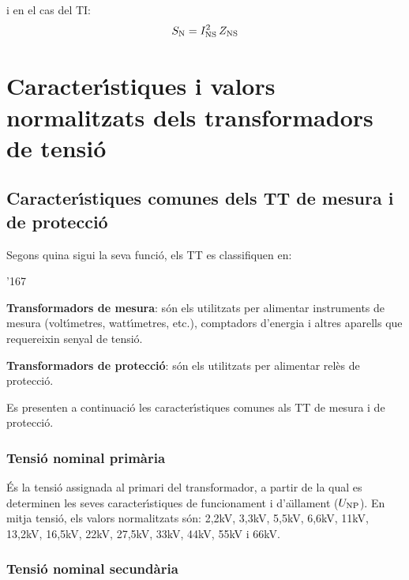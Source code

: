 i en el cas del TI:
\begin{equation}\label{eq:sn_ti}
    S_\mathrm{N} = I_\mathrm{NS}^2 \,Z_\mathrm{NS}
\end{equation}


\section{Caracter\'{\i}stiques i valors normalitzats dels transformadors de tensi\'{o}}

\subsection{Caracter\'{\i}stiques comunes dels TT de mesura i de protecci\'{o}}

Segons quina sigui la seva funci\'{o}, els TT es classifiquen en:
\begin{dinglist}{'167}
   \item \textbf{Transformadors de mesura}: s\'{o}n els utilitzats per alimentar
            instruments de mesura (volt\'{\i}metres, watt\'{\i}metres, etc.),
            comptadors d'energia i altres aparells que requereixin senyal de tensi\'{o}.
   \item \textbf{Transformadors de protecci\'{o}}: s\'{o}n els utilitzats per
   alimentar rel\`{e}s de protecci\'{o}.
\end{dinglist}

Es presenten a continuaci\'{o} les caracter\'{\i}stiques comunes als TT de
mesura i de protecci\'{o}.

\subsubsection{Tensi\'{o} nominal prim\`{a}ria}

\'{E}s la tensi\'{o} assignada al primari del transformador, a partir de la
qual es determinen les seves caracter\'{\i}stiques de funcionament i
d'a\"{\i}llament ($U_\mathrm{NP}$). En mitja tensi\'{o}, els valors normalitzats
s\'{o}n: 2,2\unit{kV}, 3,3\unit{kV}, 5,5\unit{kV}, 6,6\unit{kV},
11\unit{kV}, 13,2\unit{kV}, 16,5\unit{kV}, 22\unit{kV},
27,5\unit{kV}, 33\unit{kV}, 44\unit{kV}, 55\unit{kV} i 66\unit{kV}.

\subsubsection{Tensi\'{o} nominal secund\`{a}ria}

